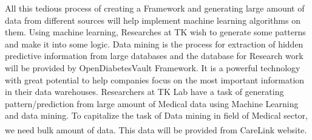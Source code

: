 \documentclass[article,type=msc,colorback,accentcolor=tud9c,twoside,11pt]{tudthesis}
\begin{document}
All this tedious process of creating a Framework and generating large amount of data from different sources will help implement machine learning algorithms on them. Using machine learning, Researches at TK wish to generate some patterns and make it into some logic. Data mining is the process for extraction of hidden predictive information from large databases and the database for Research work will be provided by OpenDiabetesVault Framework. It is a powerful technology with great potential to help companies focus on the most important information in their data warehouses. Researchers at TK Lab have a task of generating pattern/prediction from large amount of Medical data using Machine Learning and data mining. To capitalize the task of Data mining in field of Medical sector, we need bulk amount of data. This data will be provided from CareLink\textsuperscript{\textregistered} website. 
\end{document}
